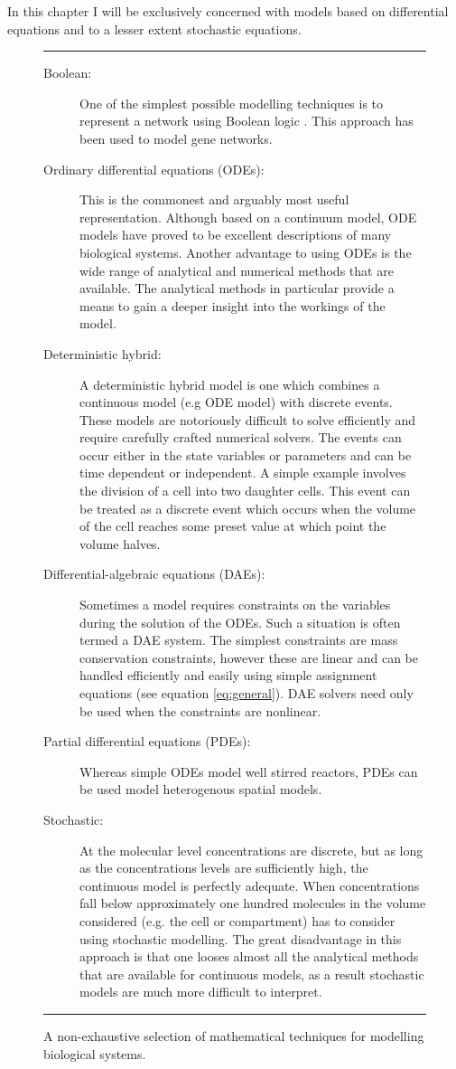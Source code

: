 \documentclass[12pt]{article}
\begin{document}
In this chapter I will be exclusively concerned with models based
on differential equations and to a lesser extent stochastic
equations.

\begin{figure} \label{table:mathTechniques}
\rule[-5pt]{14cm}{1pt}
\begin{description} 
\item[Boolean:] One of the simplest possible modelling techniques
is to represent a network using Boolean logic \cite{DeJong2002}.
This approach has been used to model gene networks.
%
\item[Ordinary differential equations (ODEs):] This is the
commonest and arguably most useful representation. Although based on
a continuum model, ODE models have proved to be excellent descriptions
of many biological systems. Another advantage to
using ODEs is the wide range of analytical and numerical methods that are available. The
analytical methods in particular provide a means to gain a deeper
insight into the workings of the model.
%
\item[Deterministic hybrid:] A deterministic hybrid model is one
which combines a continuous model (e.g ODE model) with discrete
events. These models are notoriously difficult to solve efficiently and
require carefully crafted numerical solvers. The events can occur
either in the state variables or parameters and can be
time dependent or independent. A simple example involves the
division of a cell into two daughter cells. This event can be
treated as a discrete event which occurs when the volume of the
cell reaches some preset value at which point the volume halves.
%
\item[Differential-algebraic equations (DAEs):] Sometimes a model
requires constraints on the variables during the solution of the
ODEs. Such a situation is often termed a DAE system. The simplest
constraints are mass conservation constraints, however these are
linear and can be handled efficiently and easily using simple
assignment equations (see equation \ref{eq:general}). DAE solvers need only
 be used when the constraints are nonlinear.
%
\item[Partial differential equations (PDEs):] Whereas simple ODEs
model well stirred reactors, PDEs can be used model heterogenous
spatial models. 
%
\item[Stochastic:] At the molecular level concentrations are
discrete, but as long as the concentrations levels are sufficiently high,
the continuous model is perfectly adequate. When concentrations
fall below approximately one hundred molecules in the volume considered (e.g. the cell or compartment) has to consider using stochastic modelling. The great disadvantage in
this approach is that one looses almost all the analytical methods
that are available for continuous models, as a result stochastic
models are much more difficult to interpret. 
\end{description}
\rule[6pt]{14cm}{1pt}
\caption{ A non-exhaustive selection of mathematical techniques for modelling biological systems.}
\end{figure}
\end{document}
